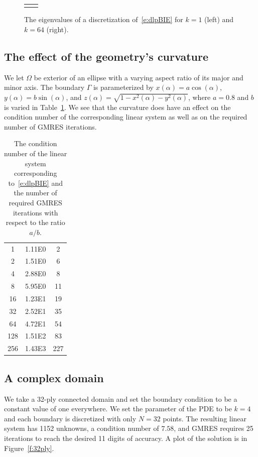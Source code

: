 \documentclass[final]{siamltex}
\begin{document}
\begin{figure}[htps]
\centering
\begin{tabular}{cc}
 &

\end{tabular}
\caption{\label{f:evalues} The eigenvalues of a discretization
of~\eqref{e:dlpBIE} for $k=1$ (left) and $k=64$ (right).}
\end{figure}


\subsection{The effect of the geometry's curvature}
We let $\Omega$ be exterior of an ellipse with a varying aspect ratio of
its major and minor axis.  The boundary $\Gamma$ is parameterized by
$x(\alpha) = a\cos(\alpha)$, $y(\alpha) = b\sin(\alpha)$, and $z(\alpha)
= \sqrt{1-x^{2}(\alpha)-y^{2}(\alpha)}$, where $a = 0.8$ and $b$ is
varied in Table~\ref{t:example3}.  We see that the curvature does have
an effect on the condition number of the corresponding linear system as
well as on the required number of GMRES iterations.

\begin{table}[htps]
\centering
\begin{tabular}{c>{\centering}m{2cm}c}
\hline
1   & 1.11E0 & 2   \\ 
2   & 1.51E0 & 6   \\
4   & 2.88E0 & 8   \\
8   & 5.95E0 & 11  \\
16  & 1.23E1 & 19  \\
32  & 2.52E1 & 35  \\
64  & 4.72E1 & 54  \\
128 & 1.51E2 & 83  \\
256 & 1.43E3 & 227 \\
\end{tabular}
\caption{\label{t:example3} The condition number of the linear system
corresponding to~\eqref{e:dlpBIE} and the number of required GMRES
iterations with respect to the ratio $a/b$.}
\end{table}


\subsection{A complex domain}
We take a 32-ply connected domain and set the boundary condition to be a
constant value of one everywhere.  We set the parameter of the PDE to be
$k=4$ and each boundary is discretized with only $N=32$ points.  The
resulting linear system has 1152 unknowns, a condition number of $7.58$,
and GMRES requires 25 iterations to reach the desired 11 digits of
accuracy.  A plot of the solution is in Figure~\ref{f:32ply}.
\end{document}
